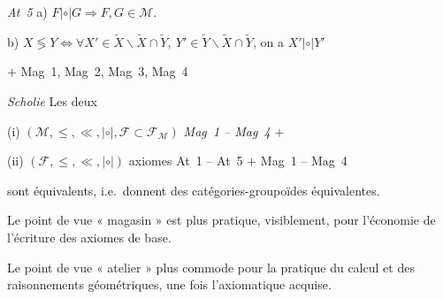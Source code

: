 \documentclass[11pt,a4paper]{article}
\begin{document}
\emph{At~5} a) $F |\circ| G \Longrightarrow F, G \in \mathcal{M}$. 

b) $X \lessgtr Y \Longleftrightarrow \forall X' \in \widetilde{X} \smallsetminus \widetilde{X} \cap \widetilde{Y},\ Y' \in \widetilde{Y} \smallsetminus \widetilde{X} \cap \widetilde{Y}$, on a $X' |\circ| Y'$


$+$ Mag~1, Mag~2, Mag~3, Mag~4

\emph{Scholie} Les deux  \ill{}

(i) $(\mathcal{M}, \leq, \ll, |\circ|, \mathcal{F} \subset \mathcal{F}_{\mathcal{M}})$ \ill{} \emph{Mag~1 -- Mag~4} $+$ 

(ii) $(\mathcal{F}, \leq, \ll, |\circ|)$ \ill{} axiomes At~1 -- At~5 $+$ Mag~1 -- Mag~4

sont équivalents, i.e.\ donnent des catégories-groupoïdes équivalentes.

Le point de vue « magasin » est plus pratique, visiblement, pour l'économie de l'écriture des axiomes de base.

Le point de vue « atelier »  plus commode pour la pratique du calcul et des raisonnements géométriques, une fois l'axiomatique acquise.

\end{document}

